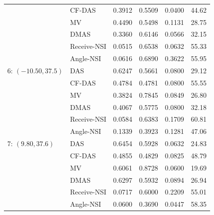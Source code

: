 \begin{tabular}{@{}llrrrr@{}}
 & CF-DAS & 0.3912 & 0.5509 & 0.0400 & 44.62 \\
 & MV & 0.4490 & 0.5498 & 0.1131 & 28.75 \\
 & DMAS & 0.3360 & 0.6146 & 0.0566 & 32.15 \\
 & Receive-NSI & 0.0515 & 0.6538 & 0.0632 & 55.33 \\
 & Angle-NSI & 0.0616 & 0.6890 & 0.3622 & 55.95 \\
\midrule
6: $(-10.50,37.5)$ & DAS & 0.6247 & 0.5661 & 0.0800 & 29.12 \\
 & CF-DAS & 0.4784 & 0.4781 & 0.0800 & 55.55 \\
 & MV & 0.3824 & 0.7845 & 0.0849 & 26.80 \\
 & DMAS & 0.4067 & 0.5775 & 0.0800 & 32.18 \\
 & Receive-NSI & 0.0584 & 0.6383 & 0.1709 & 60.81 \\
 & Angle-NSI & 0.1339 & 0.3923 & 0.1281 & 47.06 \\
\midrule
7: $(9.80,37.6)$ & DAS & 0.6454 & 0.5928 & 0.0632 & 24.83 \\
 & CF-DAS & 0.4855 & 0.4829 & 0.0825 & 48.79 \\
 & MV & 0.6061 & 0.8728 & 0.0600 & 19.69 \\
 & DMAS & 0.6297 & 0.5932 & 0.0894 & 26.94 \\
 & Receive-NSI & 0.0717 & 0.6000 & 0.2209 & 55.01 \\
 & Angle-NSI & 0.0600 & 0.3690 & 0.0447 & 58.35 \\
\bottomrule
\end{tabular}

